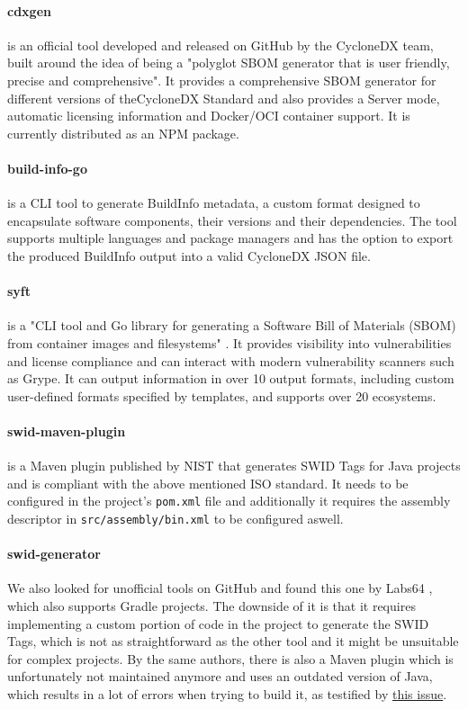 \paragraph{cdxgen} is an official tool developed and released on GitHub by the CycloneDX team, built around the idea of being a "polyglot SBOM generator that is user friendly, precise and comprehensive". It provides a comprehensive SBOM generator for different versions of theCycloneDX Standard and also provides a Server mode, automatic licensing information and Docker/OCI container support. It is currently distributed as an NPM package.

\paragraph{build-info-go} is a CLI tool to generate BuildInfo metadata, a custom format designed to encapsulate software components, their versions and their dependencies. The tool supports multiple languages and package managers and has the option to export the produced BuildInfo output into a valid CycloneDX JSON file.

\paragraph{syft} is a "CLI tool and Go library for generating a Software Bill of Materials (SBOM) from container images and filesystems" \cite{repository:cyclonedx:syft}. It provides visibility into vulnerabilities and license compliance and can interact with modern vulnerability scanners such as Grype. It can output information in over 10 output formats, including custom user-defined formats specified by templates, and supports over 20 ecosystems.


\paragraph{swid-maven-plugin} is a Maven plugin published by NIST \cite{repository:swid-maven-plugin} that generates SWID Tags for Java projects and is compliant with the above mentioned ISO standard. It needs to be configured in the project's \verb|pom.xml| file and additionally it requires the assembly descriptor in \verb|src/assembly/bin.xml| to be configured aswell.

\paragraph{swid-generator} We also looked for unofficial tools on GitHub and found this one by Labs64 \cite{repo:swid-generator}, which also supports Gradle projects. The downside of it is that it requires implementing a custom portion of code in the project to generate the SWID Tags, which is not as straightforward as the other tool and it might be unsuitable for complex projects. By the same authors, there is also a Maven plugin which is unfortunately not maintained anymore and uses an outdated version of Java, which results in a lot of errors when trying to build it, as testified by \href{https://github.com/Labs64/swid-maven-plugin/issues/5}{this issue}.


